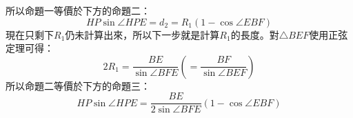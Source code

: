 \documentclass{article}
\begin{document}
\begin{center}
\end{center}
所以命題一等價於下方的命題二：
\begin{equation}
  HP\sin{\angle{HPE}}=d_2=R_1\left(1-\cos{\angle{EBF}}\right)
\end{equation}
現在只剩下$R_1$仍未計算出來，所以下一步就是計算$R_1$的長度。對$\triangle{BEF}$使用正弦定理可得：
\begin{equation}
  2R_1=\frac{BE}{\sin{\angle{BFE}}}\left(=\frac{BF}{\sin{\angle{BEF}}}\right)
\end{equation}
所以命題二等價於下方的命題三：
\begin{equation}
  HP\sin{\angle{HPE}}=\frac{BE}{2\sin{\angle{BFE}}}\left(1-\cos{\angle{EBF}}\right)
\end{equation}
\end{document}
